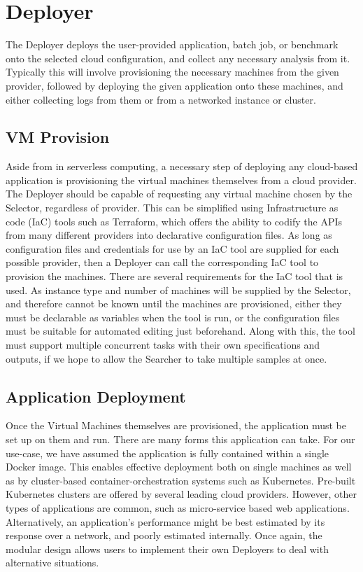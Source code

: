 \documentclass{report}
\begin{document}
\section{Deployer}
The Deployer deploys the user-provided application, batch job, or benchmark onto the selected cloud configuration, and collect any necessary analysis from it. Typically this will involve provisioning the necessary machines from the given provider, followed by deploying the given application onto these machines, and either collecting logs from them or from a networked instance or cluster. 

\subsection{VM Provision}
Aside from in serverless computing, a necessary step of deploying any cloud-based application is provisioning the virtual machines themselves from a cloud provider. The Deployer should be capable of requesting any virtual machine chosen by the Selector, regardless of provider. This can be simplified using Infrastructure as code (IaC) tools such as Terraform, which offers the ability to codify the APIs from many different providers into declarative configuration files. As long as configuration files and credentials for use by an IaC tool are supplied for each possible provider, then a Deployer can call the corresponding IaC tool to provision the machines. 
There are several requirements for the IaC tool that is used. As instance type and number of machines will be supplied by the Selector, and therefore cannot be known until the machines are provisioned, either they must be declarable as variables when the tool is run, or the configuration files must be suitable for automated editing just beforehand. Along with this, the tool must support multiple concurrent tasks with their own specifications and outputs, if we hope to allow the Searcher to take multiple samples at once.

\subsection{Application Deployment}
Once the Virtual Machines themselves are provisioned, the application must be set up on them and run. There are many forms this application can take. For our use-case, we have assumed the application is fully contained within a single Docker image. This enables effective deployment both on single machines as well as by cluster-based container-orchestration systems such as Kubernetes. Pre-built Kubernetes clusters are offered by several leading cloud providers. However, other types of applications are common, such as micro-service based web applications. Alternatively, an application's performance might be best estimated by its response over a network, and poorly estimated internally. Once again, the modular design allows users to implement their own Deployers to deal with alternative situations. 
\end{document}
